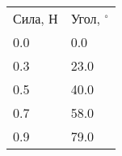 \begin{tabular}{ll}
\hline
 Сила, Н & Угол, $^\circ$ \\
 0.0     & 0.0            \\
 0.3     & 23.0           \\
 0.5     & 40.0           \\
 0.7     & 58.0           \\
 0.9     & 79.0           \\
\hline
\end{tabular}